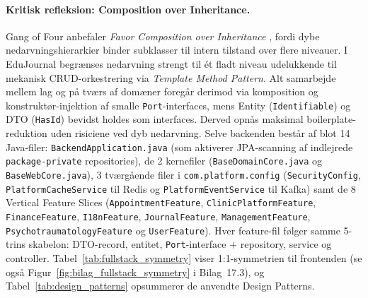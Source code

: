 \documentclass[11pt,a4paper]{article}
\begin{document}
\paragraph{Kritisk refleksion: Composition over Inheritance.} Gang of Four anbefaler \textit{Favor Composition over Inheritance} \cite{gamma1994}, fordi dybe nedarvningshierarkier binder subklasser til intern tilstand over flere niveauer. I EduJournal begrænses nedarvning strengt til ét fladt niveau udelukkende til mekanisk CRUD-orkestrering via \textit{Template Method Pattern}. Alt samarbejde mellem lag og på tværs af domæner foregår derimod via komposition og konstruktør-injektion af smalle \texttt{Port}-interfaces, mens Entity (\texttt{Identifiable}) og DTO (\texttt{HasId}) bevidst holdes som interfaces. Derved opnås maksimal boilerplate-reduktion uden risiciene ved dyb nedarvning.
\newline
Selve backenden består af blot 14 Java-filer: \texttt{BackendApplication.java} (som aktiverer JPA-scanning af indlejrede \texttt{package-private} repositories), de 2 kernefiler (\texttt{BaseDomainCore.java} og \texttt{BaseWebCore.java}), 3 tværgående filer i \texttt{com.platform.config} (\texttt{SecurityConfig}, \texttt{PlatformCacheService} til Redis og \texttt{PlatformEventService} til Kafka) samt de 8 Vertical Feature Slices (\texttt{AppointmentFeature}, \texttt{ClinicPlatformFeature}, \texttt{FinanceFeature}, \texttt{I18nFeature}, \texttt{JournalFeature}, \texttt{ManagementFeature}, \texttt{PsychotraumatologyFeature} og \texttt{UserFeature}). Hver feature-fil følger samme 5-trins skabelon: DTO-record, entitet, \texttt{Port}-interface + repository, service og controller. Tabel~\ref{tab:fullstack_symmetry} viser 1:1-symmetrien til frontenden (se også Figur~\ref{fig:bilag_fullstack_symmetry} i Bilag~17.3), og Tabel~\ref{tab:design_patterns} opsummerer de anvendte Design Patterns.
\end{document}
